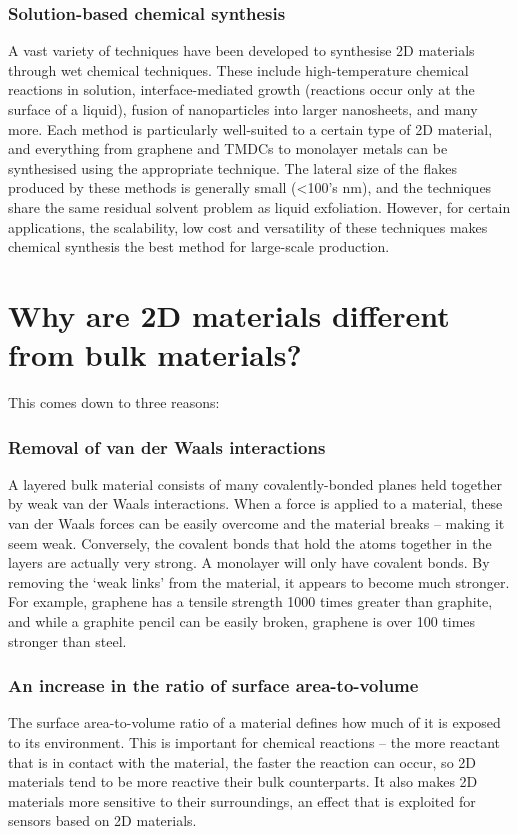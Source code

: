 \documentclass[12pt,a4paper]{report}
\begin{document}
\begin{itemize}
\subsubsection{Solution-based chemical synthesis}
A vast variety of techniques have been developed to synthesise 2D materials through wet chemical techniques. These include high-temperature chemical reactions in solution, interface-mediated growth (reactions occur only at the surface of a liquid), fusion of nanoparticles into larger nanosheets, and many more. Each method is particularly well-suited to a certain type of 2D material, and everything from graphene and TMDCs to monolayer metals can be synthesised using the appropriate technique.
The lateral size of the flakes produced by these methods is generally small (<100’s nm), and the techniques share the same residual solvent problem as liquid exfoliation. However, for certain applications, the scalability, low cost and versatility of these techniques makes chemical synthesis the best method for large-scale production.
 


\section{Why are 2D materials different from bulk materials?}

This comes down to three reasons:
\subsubsection{Removal of van der Waals interactions }
A layered bulk material consists of many covalently-bonded planes held together by weak van der Waals interactions. When a force is applied to a material, these van der Waals forces can be easily overcome and the material breaks – making it seem weak. Conversely, the covalent bonds that hold the atoms together in the layers are actually very strong. A monolayer will only have covalent bonds. By removing the ‘weak links’ from the material, it appears to become much stronger. For example, graphene has a tensile strength 1000 times greater than graphite, and while a graphite pencil can be easily broken, graphene is over 100 times stronger than steel.
\subsubsection{An increase in the ratio of surface area-to-volume }
The surface area-to-volume ratio of a material defines how much of it is exposed to its environment. This is important for chemical reactions – the more reactant that is in contact with the material, the faster the reaction can occur, so 2D materials tend to be more reactive their bulk counterparts. It also makes 2D materials more sensitive to their surroundings, an effect that is exploited for sensors based on 2D materials.

\end{itemize}
\end{document}
